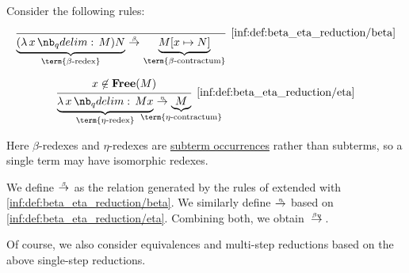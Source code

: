 \begin{definition}\label{def:beta_eta_reduction}
  Consider the following rules:
  \begin{paracol}{2}
    \begin{leftcolumn}
      \begin{equation*}\taglabel[\ensuremath{ \logic{Red}_\beta }]{inf:def:beta_eta_reduction/beta}
        \begin{prooftree}
          \infer0[\ref{inf:def:beta_eta_reduction/beta}]{ \underbrace{(\qabs x M) N}_{\T{\term{\( \beta \)-redex}}} \bred \underbrace{M[x \mapsto N]}_{\T{\term{\( \beta \)-contractum}}} },
        \end{prooftree}
      \end{equation*}
    \end{leftcolumn}

    \begin{rightcolumn}
      \begin{equation*}\taglabel[\ensuremath{ \logic{Red}_\eta }]{inf:def:beta_eta_reduction/eta}
        \begin{prooftree}
          \hypo{ x \not\in \op*{Free}(M) }
          \infer1[\ref{inf:def:beta_eta_reduction/eta}]{ \underbrace{\qabs x M x}_{\T{\term{\( \eta \)-redex}}} \ered \underbrace{M}_{\mathclap{\T{\term{\( \eta \)-contractum}}}} }.
        \end{prooftree}
      \end{equation*}
    \end{rightcolumn}
  \end{paracol}

  Here \( \beta \)-redexes and \( \eta \)-redexes are \hyperref[def:lambda_subterm_occurrence]{subterm occurrences} rather than subterms, so a single term may have isomorphic redexes.

  We define  \( {\bred} \) as the relation generated by the rules of  extended with \ref{inf:def:beta_eta_reduction/beta}. We similarly define  \( {\ered} \) based on \ref{inf:def:beta_eta_reduction/eta}. Combining both, we obtain  \( {\bered} \).
\end{definition}
\begin{comments}
  \item Of course, we also consider equivalences and multi-step reductions based on the above single-step reductions.
\end{comments}

